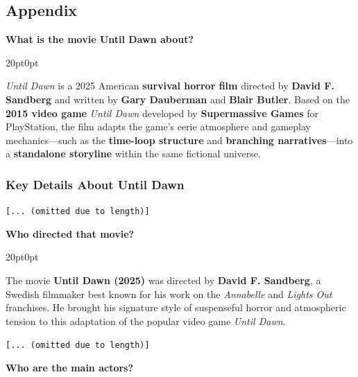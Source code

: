 \documentclass[fleqn,moreauthors,10pt]{ds_report}
\begin{document}
\newpage
\begin{appendix}

\section*{Appendix}\label{qwenconvo}

\begin{tcolorbox}[enhanced,breakable,float*,width=\textwidth,title=Conversation Example with Advanced Qwen,floatplacement=!t]


\textbf{What is the movie Until Dawn about?}

\begin{adjustwidth}{20pt}{0pt}

\emph{Until Dawn} is a 2025 American \textbf{survival horror film}
directed by \textbf{David F. Sandberg} and written by \textbf{Gary
Dauberman} and \textbf{Blair Butler}. Based on the \textbf{2015 video
game} \emph{Until Dawn} developed by \textbf{Supermassive Games} for
PlayStation, the film adapts the game's eerie atmosphere and gameplay
mechanics---such as the \textbf{time-loop structure} and
\textbf{branching narratives}---into a \textbf{standalone storyline}
within the same fictional universe.

\subsubsection*{Key Details About Until Dawn}

\texttt{[... (omitted due to length)]} \\

\end{adjustwidth}

\textbf{Who directed that movie?}

\begin{adjustwidth}{20pt}{0pt}

The movie \textbf{Until Dawn (2025)} was directed by \textbf{David F.
Sandberg}, a Swedish filmmaker best known for his work on the
\emph{Annabelle} and \emph{Lights Out} franchises. He brought his
signature style of suspenseful horror and atmospheric tension to this
adaptation of the popular video game \emph{Until Dawn}.

\texttt{[... (omitted due to length)]} \\

\end{adjustwidth}

\textbf{Who are the main actors?}


\end{tcolorbox}
\end{appendix}
\end{document}
